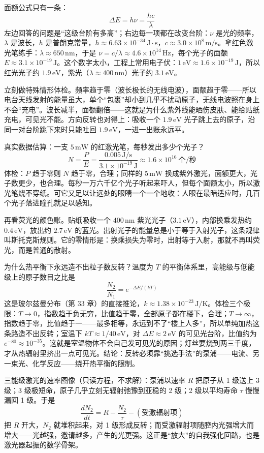 \begin{mainline}
面额公式只有一条：
\[
\Delta E=h\nu=\frac{hc}{\lambda}
\]
左边回答的问题是“这级台阶有多高”；右边每一项都在改变台阶：\(\nu\) 是光的频率，\(\lambda\) 是波长，\(h\) 是普朗克常量，\(h\approx 6.63\times10^{-34}\,\mathrm{J\cdot s}\)，\(c\approx 3.0\times10^{8}\,\mathrm{m/s}\)。拿红色激光笔练手：\(\lambda\approx 650\,\mathrm{nm}\)，于是 \(\nu=c/\lambda\approx 4.6\times10^{14}\,\mathrm{Hz}\)，每个光子的面额 \(E\approx 3.1\times10^{-19}\,\mathrm{J}\)。这个数字太小，工程上常用电子伏：\(1\,\mathrm{eV}\approx 1.6\times10^{-19}\,\mathrm{J}\)，所以红光光子约 \(1.9\,\mathrm{eV}\)，紫光（\(\lambda\approx 400\,\mathrm{nm}\)）光子约 \(3.1\,\mathrm{eV}\)。

立刻做特殊情形体检。频率趋于零（波长极长的无线电波），面额趋于零——所以电台天线发射的能量虽大，单个“包裹”却小到几乎不扰动原子，无线电波照在身上不会“充电”。波长减半，面额翻倍——这就是为什么紫外线能晒伤皮肤、能给贴纸充电，可见光不能。方向反转也对得上：吸收一个 \(1.9\,\mathrm{eV}\) 光子跳上去的原子，沿同一对台阶跳下来时只能吐回 \(1.9\,\mathrm{eV}\)，一进一出账永远平。

真实数据估算：一支 \(5\,\mathrm{mW}\) 的红激光笔，每秒发出多少个光子？
\[
N=\frac{P}{E}=\frac{0.005\,\mathrm{J/s}}{3.1\times10^{-19}\,\mathrm{J}}\approx 1.6\times10^{16}\ \text{个/秒}
\]
体检：\(P\) 趋于零则 \(N\) 趋于零，合理；同样的 \(5\,\mathrm{mW}\) 换成紫外激光，面额更大，光子数更少，也合理。每秒一万六千亿个光子听起来吓人，但每个面额太小，所以激光笔烧不穿纸。可它又足以让远处的眼睛一个一个地收：人眼在最暗适应时，几百个光子落进瞳孔就足以感知。

再看荧光的颜色账。贴纸吸收一个 \(400\,\mathrm{nm}\) 紫光光子（\(3.1\,\mathrm{eV}\)），内部换乘发热约 \(0.4\,\mathrm{eV}\)，放出约 \(2.7\,\mathrm{eV}\) 的蓝光。出射光子的能量总是小于等于入射光子，这条规律叫斯托克斯规则。它的零情形是：换乘损失为零时，出射等于入射，那就不再叫荧光，而是普通的散射。
\end{mainline}

\begin{mathbridge}
为什么热平衡下永远造不出粒子数反转？温度为 \(T\) 的平衡体系里，高能级与低能级上的原子数目之比是
\[
\frac{N_2}{N_1}=e^{-\Delta E/(kT)}
\]
这是玻尔兹曼分布（第 33 章）的直接推论，\(k\approx 1.38\times10^{-23}\,\mathrm{J/K}\)。体检三个极限：\(T\to 0\)，指数趋于负无穷，比值趋于零，全部原子都在楼下，合理；\(T\to\infty\)，指数趋于零，比值趋于一——最多相等，永远到不了“楼上人多”，所以单纯加热这条路造不出反转；室温下 \(kT\approx 1/40\,\mathrm{eV}\)，对 \(\Delta E\approx 2\,\mathrm{eV}\) 的可见光台阶，比值约为 \(e^{-80}\approx 10^{-35}\)。这就是室温物体不会自己发可见光的原因；灯丝要烧到两三千度，才从热辐射里挤出一点可见光。结论：反转必须靠“挑选手法”的泵浦——电流、另一束光、化学反应——绕开热平衡的限制。

三能级激光的速率图像（只读方程，不求解）：泵浦以速率 \(R\) 把原子从 1 级送上 3 级；3 级极短命，原子几乎立刻无辐射弛豫到亚稳的 2 级；2 级以平均寿命 \(\tau\) 慢慢漏回 1 级。于是
\[
\frac{dN_2}{dt}=R-\frac{N_2}{\tau}-(\text{受激辐射项})
\]
把 \(R\) 开大，\(N_2\) 就堆积起来，对 1 级形成反转；而受激辐射项随腔内光强增大而增大——光越强，邀请越多，产生的光更强。这正是“放大”的自我强化回路，也是激光器起振的数学骨架。
\end{mathbridge}

